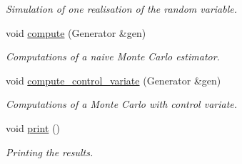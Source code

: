\begin{DoxyCompactItemize}
\begin{DoxyCompactList}\small\item\em Simulation of one realisation of the random variable. \end{DoxyCompactList}\item 
void \hyperlink{classmonte__carlo_a598c1fbac6b56ee278fd04bf6115b1d3}{compute} (Generator \&gen)
\begin{DoxyCompactList}\small\item\em Computations of a naive Monte Carlo estimator. \end{DoxyCompactList}\item 
void \hyperlink{classmonte__carlo_a3e6b3ac3d957335c94a2e07b5ecf4cf0}{compute\+\_\+control\+\_\+variate} (Generator \&gen)\hypertarget{classmonte__carlo_a3e6b3ac3d957335c94a2e07b5ecf4cf0}{}\label{classmonte__carlo_a3e6b3ac3d957335c94a2e07b5ecf4cf0}

\begin{DoxyCompactList}\small\item\em Computations of a Monte Carlo with control variate. \end{DoxyCompactList}\item 
void \hyperlink{classmonte__carlo_a5fb1de57e0f77deb8ff167589b9e8b9e}{print} ()
\begin{DoxyCompactList}\small\item\em Printing the results. \end{DoxyCompactList}\end{DoxyCompactItemize}
